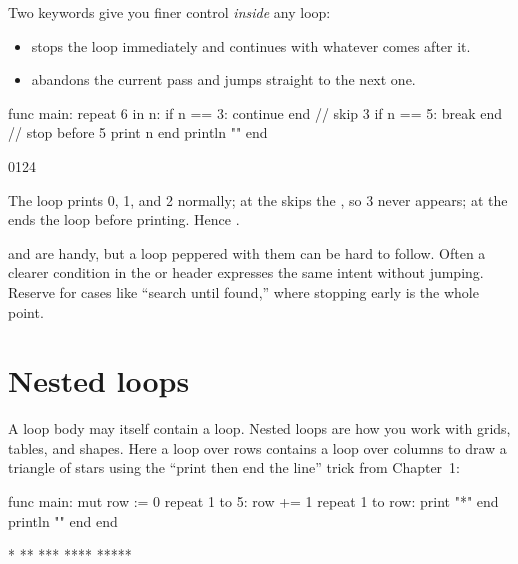 Two keywords give you finer control \emph{inside} any loop:

\begin{itemize}[leftmargin=1.4em]
  \item {} stops the loop immediately and continues with whatever comes
        after it.
  \item {} abandons the current pass and jumps straight to the next
        one.
\end{itemize}

\begin{salamen}
func main:
    repeat 6 in n:
        if n == 3: continue end      // skip 3
        if n == 5: break end         // stop before 5
        print n
    end
    println ""
end
\end{salamen}

\begin{progout}
0124
\end{progout}

The loop prints 0, 1, and 2 normally; at  the  skips
the , so 3 never appears; at  the  ends the
loop before printing. Hence .

\begin{tip}
 and  are handy, but a loop peppered with them can be
hard to follow. Often a clearer condition in the  or 
header expresses the same intent without jumping. Reserve  for cases
like ``search until found,'' where stopping early is the whole point.
\end{tip}

\section{Nested loops}

A loop body may itself contain a loop. Nested loops are how you work with grids,
tables, and shapes. Here a loop over rows contains a loop over columns to draw a
triangle of stars using the ``print then end the line'' trick from Chapter~1:

\begin{salamen}
func main:
    mut row := 0
    repeat 1 to 5:
        row += 1
        repeat 1 to row:
            print "*"
        end
        println ""
    end
end
\end{salamen}

\begin{progout}
*
**
***
****
*****
\end{progout}

